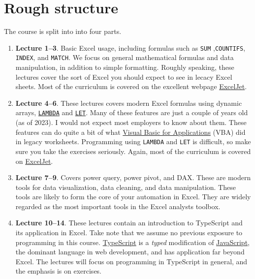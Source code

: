 \documentclass[
  letterpaper,
  DIV=11,
  numbers=noendperiod]{scrreprt}
\begin{document}
\hypertarget{rough-structure}{%
\section*{Rough structure}\label{rough-structure}}


The course is split into into four parts.

\begin{enumerate}
\def\labelenumi{\arabic{enumi}.}
\item
  \textbf{Lecture 1--3}. Basic Excel usage, including formulas such as
  \texttt{SUM} ,\texttt{COUNTIFS}, \texttt{INDEX}, and \texttt{MATCH}.
  We focus on general mathematical formulas and data manipulation, in
  addition to simple formatting. Roughly speaking, these lectures cover
  the sort of Excel you should expect to see in lecacy Excel sheets.
  Most of the curriculum is covered on the excellent webpage
  \href{https://exceljet.net/}{ExcelJet}.
\item
  \textbf{Lecture 4--6}. These lectures covers modern Excel formulas
  using dynamic arrays,
  \href{https://www.microsoft.com/en-us/research/blog/lambda-the-ultimatae-excel-worksheet-function/}{\texttt{LAMBDA}}
  and \href{https://exceljet.net/functions/let-function}{\texttt{LET}}.
  Many of these features are just a couple of years old (as of 2023). I
  would not expect most employers to know about them. These features can
  do quite a bit of what
  \href{https://en.wikipedia.org/wiki/Visual_Basic_for_Applications}{Visual
  Basic for Applications} (VBA) did in legacy worksheets. Programming
  using \texttt{LAMBDA} and \texttt{LET} is difficult, so make sure you
  take the exercises seriously. Again, most of the curriculum is covered
  on \href{https://exceljet.net/}{ExcelJet}.
\item
  \textbf{Lecture 7--9}. Covers power query, power pivot, and DAX. These
  are modern tools for data visualization, data cleaning, and data
  manipulation. These tools are likely to form the core of your
  automation in Excel. They are widely regarded as the most important
  tools in the Excel analysts toolbox.
\item
  \textbf{Lecture 10--14}. These lectures contain an introduction to
  TypeScript and its application in Excel. Take note that we assume no
  previous exposure to programming in this course.
  \href{https://en.wikipedia.org/wiki/TypeScript}{TypeScript} is a
  \emph{typed} modification of
  \href{https://en.wikipedia.org/wiki/JavaScript}{JavaScript}, the
  dominant language in web development, and has application far beyond
  Excel. The lectures will focus on programming in TypeScript in
  general, and the emphasis is on exercises.
\end{enumerate}
\end{document}
